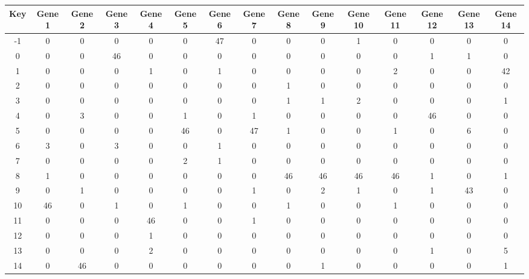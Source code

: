 \begin{tabular}{|c|c|c|c|c|c|c|c|c|c|c|c|c|c|c|}
\hline
Key & Gene 1 & Gene 2 & Gene 3 & Gene 4 & Gene 5 & Gene 6 & Gene 7 & Gene 8 & Gene 9 & Gene 10 & Gene 11 & Gene 12 & Gene 13 & Gene 14 \\
\hline
-1 & 0 & 0 & 0 & 0 & 0 & 47 & 0 & 0 & 0 & 1 & 0 & 0 & 0 & 0 \\
0 & 0 & 0 & 46 & 0 & 0 & 0 & 0 & 0 & 0 & 0 & 0 & 1 & 1 & 0 \\
1 & 0 & 0 & 0 & 1 & 0 & 1 & 0 & 0 & 0 & 0 & 2 & 0 & 0 & 42 \\
2 & 0 & 0 & 0 & 0 & 0 & 0 & 0 & 1 & 0 & 0 & 0 & 0 & 0 & 0 \\
3 & 0 & 0 & 0 & 0 & 0 & 0 & 0 & 1 & 1 & 2 & 0 & 0 & 0 & 1 \\
4 & 0 & 3 & 0 & 0 & 1 & 0 & 1 & 0 & 0 & 0 & 0 & 46 & 0 & 0 \\
5 & 0 & 0 & 0 & 0 & 46 & 0 & 47 & 1 & 0 & 0 & 1 & 0 & 6 & 0 \\
6 & 3 & 0 & 3 & 0 & 0 & 1 & 0 & 0 & 0 & 0 & 0 & 0 & 0 & 0 \\
7 & 0 & 0 & 0 & 0 & 2 & 1 & 0 & 0 & 0 & 0 & 0 & 0 & 0 & 0 \\
8 & 1 & 0 & 0 & 0 & 0 & 0 & 0 & 46 & 46 & 46 & 46 & 1 & 0 & 1 \\
9 & 0 & 1 & 0 & 0 & 0 & 0 & 1 & 0 & 2 & 1 & 0 & 1 & 43 & 0 \\
10 & 46 & 0 & 1 & 0 & 1 & 0 & 0 & 1 & 0 & 0 & 1 & 0 & 0 & 0 \\
11 & 0 & 0 & 0 & 46 & 0 & 0 & 1 & 0 & 0 & 0 & 0 & 0 & 0 & 0 \\
12 & 0 & 0 & 0 & 1 & 0 & 0 & 0 & 0 & 0 & 0 & 0 & 0 & 0 & 0 \\
13 & 0 & 0 & 0 & 2 & 0 & 0 & 0 & 0 & 0 & 0 & 0 & 1 & 0 & 5 \\
14 & 0 & 46 & 0 & 0 & 0 & 0 & 0 & 0 & 1 & 0 & 0 & 0 & 0 & 1 \\
\hline
\end{tabular}
